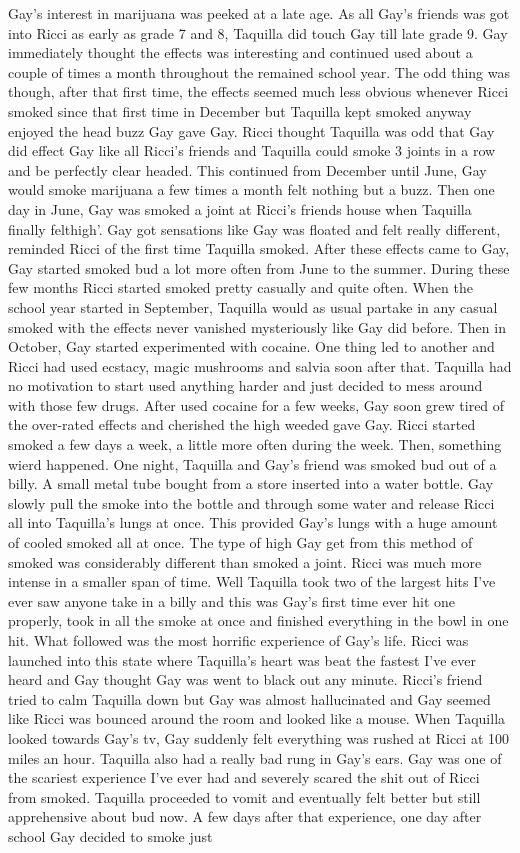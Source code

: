 \documentclass[12pt]{book}
\begin{document}
Gay's interest in marijuana was peeked at a late age. As all Gay's friends was got into Ricci as early as grade 7 and 8, Taquilla did touch Gay till late grade 9. Gay immediately thought the effects was interesting and continued used about a couple of times a month throughout the remained school year. The odd thing was though, after that first time, the effects seemed much less obvious whenever Ricci smoked since that first time in December but Taquilla kept smoked anyway enjoyed the head buzz Gay gave Gay. Ricci thought Taquilla was odd that Gay did effect Gay like all Ricci's friends and Taquilla could smoke 3 joints in a row and be perfectly clear headed. This continued from December until June, Gay would smoke marijuana a few times a month felt nothing but a buzz. Then one day in June, Gay was smoked a joint at Ricci's friends house when Taquilla finally felthigh'. Gay got sensations like Gay was floated and felt really different, reminded Ricci of the first time Taquilla smoked. After these effects came to Gay, Gay started smoked bud a lot more often from June to the summer. During these few months Ricci started smoked pretty casually and quite often. When the school year started in September, Taquilla would as usual partake in any casual smoked with the effects never vanished mysteriously like Gay did before. Then in October, Gay started experimented with cocaine. One thing led to another and Ricci had used ecstacy, magic mushrooms and salvia soon after that. Taquilla had no motivation to start used anything harder and just decided to mess around with those few drugs. After used cocaine for a few weeks, Gay soon grew tired of the over-rated effects and cherished the high weeded gave Gay. Ricci started smoked a few days a week, a little more often during the week. Then, something wierd happened. One night, Taquilla and Gay's friend was smoked bud out of a billy. A small metal tube bought from a store inserted into a water bottle. Gay slowly pull the smoke into the bottle and through some water and release Ricci all into Taquilla's lungs at once. This provided Gay's lungs with a huge amount of cooled smoked all at once. The type of high Gay get from this method of smoked was considerably different than smoked a joint. Ricci was much more intense in a smaller span of time. Well Taquilla took two of the largest hits I've ever saw anyone take in a billy and this was Gay's first time ever hit one properly, took in all the smoke at once and finished everything in the bowl in one hit. What followed was the most horrific experience of Gay's life. Ricci was launched into this state where Taquilla's heart was beat the fastest I've ever heard and Gay thought Gay was went to black out any minute. Ricci's friend tried to calm Taquilla down but Gay was almost hallucinated and Gay seemed like Ricci was bounced around the room and looked like a mouse. When Taquilla looked towards Gay's tv, Gay suddenly felt everything was rushed at Ricci at 100 miles an hour. Taquilla also had a really bad rung in Gay's ears. Gay was one of the scariest experience I've ever had and severely scared the shit out of Ricci from smoked. Taquilla proceeded to vomit and eventually felt better but still apprehensive about bud now. A few days after that experience, one day after school Gay decided to smoke just 
\end{document}

